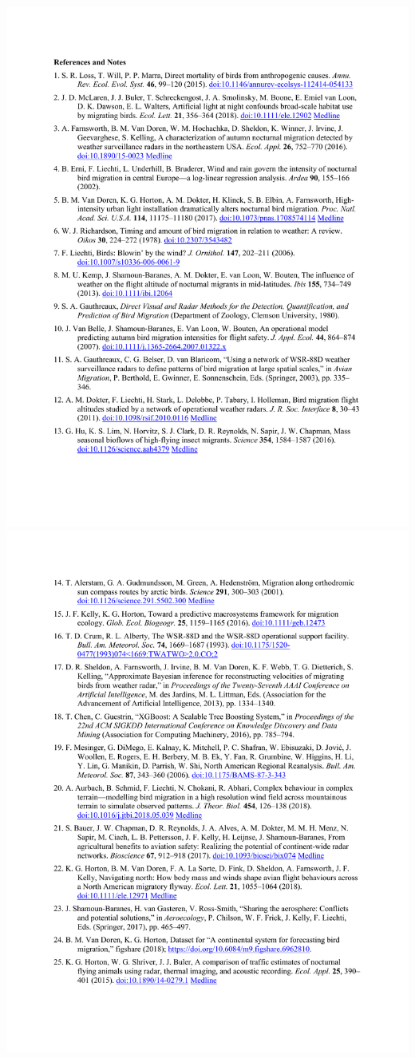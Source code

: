 \documentclass[a4paper, twoside]{templates/ociamthesis}
\begin{document}
\includegraphics[width=1\linewidth]{pdf_chapters/forecast/forecast_supp_crop_Part16}
\includegraphics[width=1\linewidth]{pdf_chapters/forecast/forecast_supp_crop_Part17}
\end{document}

